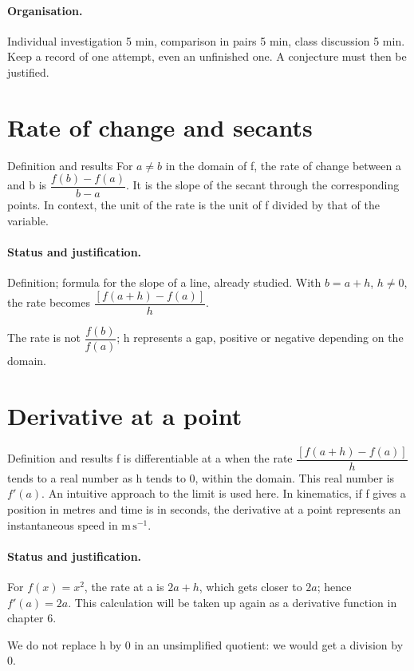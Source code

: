 \paragraph{Organisation.} Individual investigation 5 min, comparison in pairs 5 min, class discussion 5 min. Keep a record of one attempt, even an unfinished one. A conjecture must then be justified.
\section{Rate of change and secants}\label{C04-U1}
\begin{repere}{Definition and results}
For $a\ne b$ in the domain of f, the rate of change between a and b is $\dfrac{f(b)-f(a)}{b-a}$. It is the slope of the secant through the corresponding points. In context, the unit of the rate is the unit of f divided by that of the variable.
\end{repere}
\paragraph{Status and justification.} Definition; formula for the slope of a line, already studied. With $b=a+h$, $h\ne0$, the rate becomes $\dfrac{[f(a+h)-f(a)]}{h}$.
\label{C04-EX1}
\begin{erreur}The rate is not $\dfrac{f(b)}{f(a)}$; h represents a gap, positive or negative depending on the domain.\end{erreur}
\label{C04-AP1}
\section{Derivative at a point}\label{C04-U2}
\begin{repere}{Definition and results}
f is differentiable at a when the rate $\dfrac{[f(a+h)-f(a)]}{h}$ tends to a real number as h tends to 0, within the domain. This real number is $f\prime(a)$. An intuitive approach to the limit is used here. In kinematics, if f gives a position in metres and time is in seconds, the derivative at a point represents an instantaneous speed in $\mathrm{m\,s^{-1}}$.
\end{repere}
\paragraph{Status and justification.} For $f(x)=x^2$, the rate at a is $2a+h$, which gets closer to $2a$; hence $f\prime(a)=2a$. This calculation will be taken up again as a derivative function in chapter 6.
\label{C04-EX2}
\begin{erreur}We do not replace h by 0 in an unsimplified quotient: we would get a division by 0.\end{erreur}
\label{C04-AP2}
